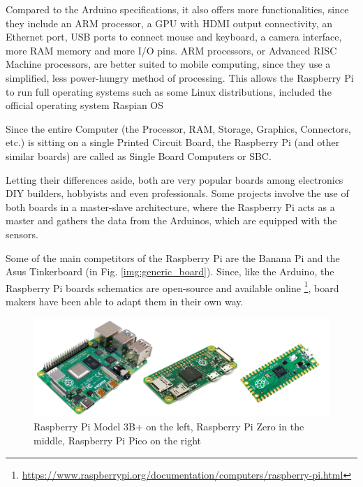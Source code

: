 		Compared to the Arduino specifications, it also offers more functionalities, since they include an ARM processor, a GPU with HDMI output connectivity, an Ethernet port, USB ports to connect mouse and keyboard, a camera interface, more RAM memory and more I/O pins.
		ARM processors, or Advanced RISC Machine processors, are better suited to mobile computing, since they use a simplified, less power-hungry method of processing.
		This allows the Raspberry Pi to run full operating systems such as some Linux distributions, included the official operating system Raspian OS
		
		Since the entire Computer (the Processor, RAM, Storage, Graphics, Connectors, etc.) is sitting on a single Printed Circuit Board, the Raspberry Pi (and other similar boards) are called as Single Board Computers or SBC.
		
		Letting their differences aside, both are very popular boards among electronics DIY builders, hobbyists and even professionals.
		Some projects involve the use of both boards in a master-slave architecture, where the Raspberry Pi acts as a master and gathers the data from the Arduinos, which are equipped with the sensors.
		
		Some of the main competitors of the Raspberry Pi are the Banana Pi and the Asus Tinkerboard (in Fig. \ref{img:generic_board}).
		Since, like the Arduino, the Raspberry Pi boards schematics are open-source and available online \footnote{\url{https://www.raspberrypi.org/documentation/computers/raspberry-pi.html}}, board makers have been able to adapt them in their own way.

		
		\begin{figure}[H]
			\centering
			\includegraphics[width=\textwidth]{resources/img/chap3/raspberry_types}
			\caption{Raspberry Pi Model 3B+ on the left, Raspberry Pi Zero in the middle, Raspberry Pi Pico on the right}
			\label{img:raspberry_board}
		\end{figure}
		
